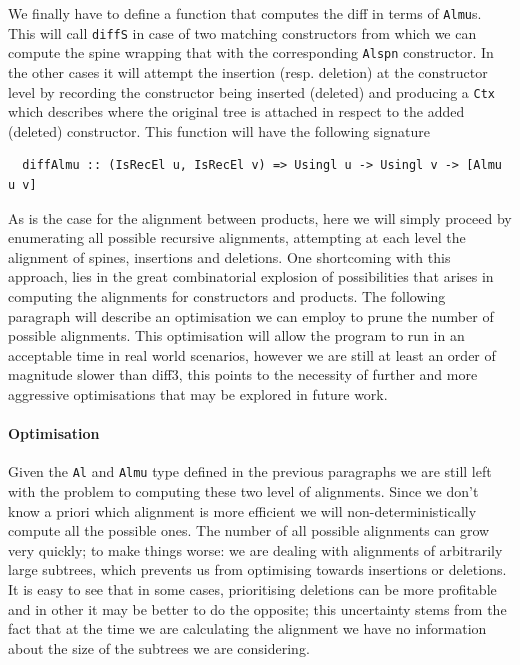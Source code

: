 \documentclass[11pt]{article}
\begin{document}
We finally have to define a function that computes the diff in terms of 
\texttt{Almu}s. This will call \texttt{diffS} in case of two matching constructors from which we can compute
the spine wrapping that with the corresponding \texttt{Alspn} constructor. In the other cases it will 
attempt the insertion (resp. deletion) at the constructor level by recording the constructor being inserted
(deleted) and producing a \texttt{Ctx} which describes where the original tree is attached in respect to
the added (deleted) constructor.
This function will have the following signature

\begin{lstlisting}
  diffAlmu :: (IsRecEl u, IsRecEl v) => Usingl u -> Usingl v -> [Almu u v]
\end{lstlisting}

As is the case for the alignment between products, here we will simply proceed 
by enumerating all possible recursive alignments, attempting at each level 
the alignment of spines, insertions and deletions.
One shortcoming with this approach, lies in the great combinatorial 
explosion of possibilities that arises in computing the alignments for 
constructors and products. The following paragraph will describe an optimisation 
we can employ to prune the number of possible alignments. This optimisation 
will allow the program to run in an acceptable time in real world scenarios, however 
we are still at least an order of magnitude slower than diff3, this points to 
the necessity of further and more aggressive optimisations that may be explored 
in future work.

\paragraph{Optimisation}\label{optimisations}

Given the \texttt{Al} and \texttt{Almu} type defined in the previous paragraphs we are still left with the problem
to computing these two level of alignments. Since we don't know a priori which alignment
is more efficient we will non-deterministically compute all the possible ones. The number of all possible alignments  
can grow very quickly; to make things worse: we are dealing with alignments of arbitrarily large subtrees, which prevents
us from optimising towards insertions or deletions. It is easy to see
that in some cases, prioritising deletions can be more profitable and in
other it may be better to do the opposite; this uncertainty stems from
the fact that at the time we are calculating the alignment we have no
information about the size of the subtrees we are considering.
\end{document}
